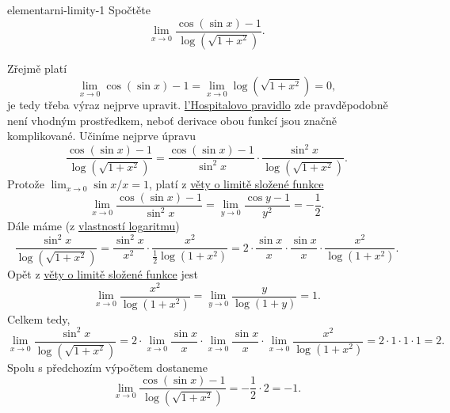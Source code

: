 \begin{problem}{}{elementarni-limity-1}
 Spočtěte
 \[
  \lim_{x \to 0} \frac{\cos(\sin x) - 1}{\log(\sqrt{1 + x^2})}.
 \]
\end{problem}
\begin{probsol}
 Zřejmě platí
 \[
  \lim_{x \to 0} \cos(\sin x) - 1 = \lim_{x \to 0} \log(\sqrt{1 + x^2}) = 0,
 \]
 je tedy třeba výraz nejprve upravit. \hyperref[thm:lhospital]{l'Hospitalovo
 pravidlo} zde pravděpodobně není vhodným prostředkem, neboť derivace obou
 funkcí jsou značně komplikované. Učiníme nejprve úpravu
 \[
  \frac{\cos(\sin x) - 1}{\log(\sqrt{1 + x^2})} = \frac{\cos(\sin x) -
  1}{\sin^2 x} \cdot \frac{\sin^2 x}{\log(\sqrt{1 + x^2})}.
 \]
 Protože $\lim_{x \to 0} \sin x / x = 1$, platí z
 \hyperref[thm:limita-slozene-funkce]{věty o limitě složené funkce}
 \[
  \lim_{x \to 0} \frac{\cos(\sin x) - 1}{\sin^2 x} = \lim_{y \to 0} \frac{\cos y
  - 1}{y^2} = -\frac{1}{2}.
 \]
 Dále máme (z \hyperref[prop:vlastnosti-logaritmu]{vlastností logaritmu})
 \[
  \frac{\sin^2 x}{\log(\sqrt{1 + x^2})} = \frac{\sin^2 x}{x^2} \cdot
  \frac{x^2}{\frac{1}{2}\log(1 + x^2)} = 2 \cdot \frac{\sin x}{x} \cdot
  \frac{\sin x}{x} \cdot \frac{x^2}{\log(1 + x^2)}.
 \]
 Opět z \hyperref[thm:limita-slozene-funkce]{věty o limitě složené funkce} jest
 \[
  \lim_{x \to 0} \frac{x^2}{\log(1 + x^2)} = \lim_{y \to 0} \frac{y}{\log(1 +
  y)} = 1.
 \]
 Celkem tedy,
 \[
  \lim_{x \to 0} \frac{\sin^2 x}{\log(\sqrt{1 + x^2})} = 2 \cdot \lim_{x \to 0}
  \frac{\sin x}{x} \cdot \lim_{x \to 0} \frac{\sin x}{x} \cdot \lim_{x \to 0}
  \frac{x^2}{\log(1 + x^2)} = 2 \cdot 1 \cdot 1 \cdot 1 = 2.
 \]
 Spolu s předchozím výpočtem dostaneme
 \[
  \lim_{x \to 0} \frac{\cos(\sin x) - 1}{\log(\sqrt{1 + x^2})} = -\frac{1}{2}
  \cdot 2 = -1.
 \]
\end{probsol}

